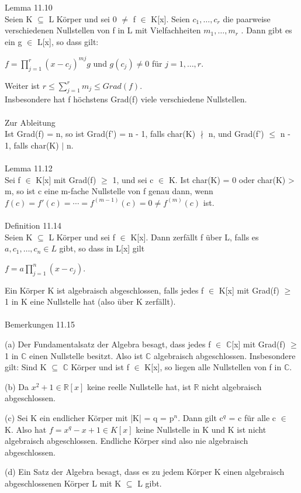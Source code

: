 Lemma 11.10\\
Seien K $\subseteq$ L Körper und sei 0 $\neq$ f $\in$ K[x]. Seien $c_1, …, c_r$ die paarweise verschiedenen Nullstellen von f in L mit Vielfachheiten $m_1 , …, m_r$ . Dann gibt es ein g $\in$ L[x], so dass gilt:
\begin{center}
$f = \prod\limits_{j=1}^{r} (x - c_j)^{mj} g$ und $g(c_j) \neq 0$ für $j = 1, …, r$.
\end{center}
Weiter ist $r \le \sum\nolimits_{j=1}^{r}m_j \le Grad(f)$.\\
Insbesondere hat f höchstens Grad(f) viele verschiedene Nullstellen.\\
\\
Zur Ableitung\\
Ist Grad(f) = n, so ist Grad(f') = n - 1, falls char(K) $\nmid$ n, und Grad(f') $\le$ n - 1, falls char(K) $\mid$ n.\\
\\
Lemma 11.12\\
Sei f $\in$ K[x] mit Grad(f) $\ge$ 1, und sei c $\in$ K. Ist char(K) = 0 oder char(K) > m, so ist c eine m-fache Nullstelle von f genau dann, wenn $f(c) = f'(c) = \cdots = f^{(m-1)}(c) = 0 \neq f^{(m)}(c)$ ist.\\
\\
Definition 11.14\\
Seien K $\subseteq$ L Körper und sei f $\in$ K[x]. Dann zerfällt f über L, falls es $a, c_1, …, c_n \in L$ gibt, so dass in L[x] gilt
\begin{center}
$f = a \prod\limits_{j=1}^{n}(x - c_j)$.
\end{center}
Ein Körper K ist algebraisch abgeschlossen, falls jedes f $\in$ K[x] mit Grad(f) $\ge$ 1 in K eine Nullstelle hat (also über K zerfällt).\\
\\
Bemerkungen 11.15
\begin{compactenum}
\item[(a)] Der Fundamentalsatz der Algebra besagt, dass jedes f $\in$ $\mathbb{C}$[x] mit Grad(f) $\ge$ 1 in $\mathbb{C}$ einen Nullstelle besitzt. Also ist $\mathbb{C}$ algebraisch abgeschlossen. Insbesondere gilt: Sind K $\subseteq$ $\mathbb{C}$ Körper und ist f $\in$ K[x], so liegen alle Nullstellen von f in $\mathbb{C}$.
\item[(b)] Da $x^2 + 1 \in \mathbb{R}[x]$ keine reelle Nullstelle hat, ist $\mathbb{R}$ nicht algebraisch abgeschlossen.
\item[(c)] Sei K ein endlicher Körper mit |K| = q = p$^n$. Dann gilt c$^q$ = c für alle c $\in$ K. Also hat $f = x^q - x+1 \in K[x]$ keine Nullstelle in K und K ist nicht algebraisch abgeschlossen. Endliche Körper sind also nie algebraisch abgeschlossen.
\item[(d)] Ein Satz der Algebra besagt, dass es zu jedem Körper K einen algebraisch abgeschlossenen Körper L mit K $\subseteq$ L gibt.\\
\end{compactenum}
